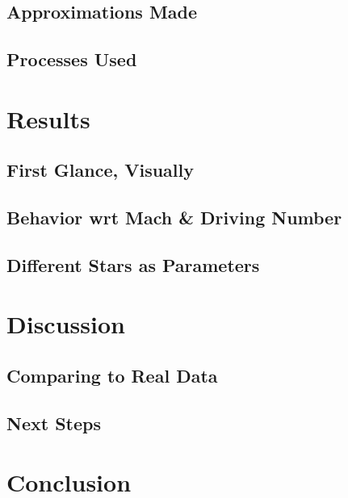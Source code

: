 \documentclass{article}
\begin{document}
\subsection{Approximations Made}
\subsection{Processes Used}
\section{Results}
\subsection{First Glance, Visually}
\subsection{Behavior wrt Mach \& Driving Number}
\subsection{Different Stars as Parameters}
\section{Discussion}
\subsection{Comparing to Real Data}
\subsection{Next Steps}
\section{Conclusion}
\end{document}
